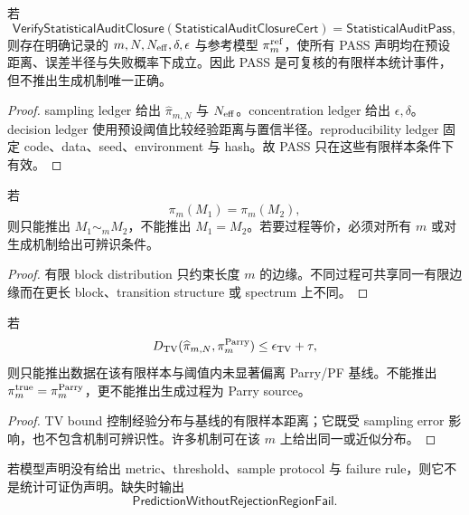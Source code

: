 \begin{theorem}[有限样本统计可靠性]\label{thm:typed-address-biaxial-completion-finite-sample-statistical-soundness}
若
\[
\mathsf{VerifyStatisticalAuditClosure}
(\mathsf{StatisticalAuditClosureCert})
=
\mathsf{StatisticalAuditPass},
\]
则存在明确记录的 \(m,N,N_{\rm eff},\delta,\epsilon\) 与参考模型 \(\pi_m^{\rm ref}\)，使所有 PASS 声明均在预设距离、误差半径与失败概率下成立。因此 PASS 是可复核的有限样本统计事件，但不推出生成机制唯一正确。
\end{theorem}

\begin{proof}
sampling ledger 给出 \(\widehat\pi_{m,N}\) 与 \(N_{\rm eff}\)。concentration ledger 给出 \(\epsilon,\delta\)。decision ledger 使用预设阈值比较经验距离与置信半径。reproducibility ledger 固定 code、data、seed、environment 与 hash。故 PASS 只在这些有限样本条件下有效。
\end{proof}

\begin{theorem}[有限边缘拟合不识别过程]\label{thm:typed-address-biaxial-completion-finite-marginal-nonidentification}
若
\[
\pi_m(M_1)=\pi_m(M_2),
\]
则只能推出 \(M_1\sim_m M_2\)，不能推出 \(M_1=M_2\)。若要过程等价，必须对所有 \(m\) 或对生成机制给出可辨识条件。
\end{theorem}

\begin{proof}
有限 block distribution 只约束长度 \(m\) 的边缘。不同过程可共享同一有限边缘而在更长 block、transition structure 或 spectrum 上不同。
\end{proof}

\begin{theorem}\label{thm:typed-address-biaxial-completion-parry-baseline-not-oracle}
若
\[
D_{\rm TV}(\widehat\pi_{m,N},\pi_m^{\rm Parry})
\le
\epsilon_{\rm TV}+\tau,
\]
则只能推出数据在该有限样本与阈值内未显著偏离 Parry/PF 基线。不能推出 \(\pi_m^{\rm true}=\pi_m^{\rm Parry}\)，更不能推出生成过程为 Parry source。
\end{theorem}

\begin{proof}
TV bound 控制经验分布与基线的有限样本距离；它既受 sampling error 影响，也不包含机制可辨识性。许多机制可在该 \(m\) 上给出同一或近似分布。
\end{proof}

\begin{theorem}[可证伪声明需要拒绝域]\label{thm:typed-address-biaxial-completion-falsifiability-rejection-region}
若模型声明没有给出 metric、threshold、sample protocol 与 failure rule，则它不是统计可证伪声明。缺失时输出
\[
\boxed{\mathsf{PredictionWithoutRejectionRegionFail}.}
\]
\end{theorem}

